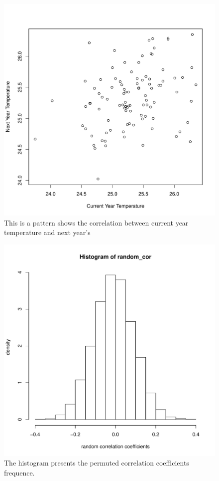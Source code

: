 \documentclass[12pt]{article}
\begin{document}
    \begin{figure}
      \centering
      \includegraphics[width = \textwidth]{../result/TAutoCorr_plot1.pdf}
      \caption{This is a pattern shows the correlation between current year temperature and next year's}
    \end{figure}
    
    \begin{figure}
      \centering
      \includegraphics[width = \textwidth]{../result/TAutoCorr_plot2.pdf}
      \caption{The histogram presents the permuted correlation coefficients frequence.}
    \end{figure}
\end{document}
